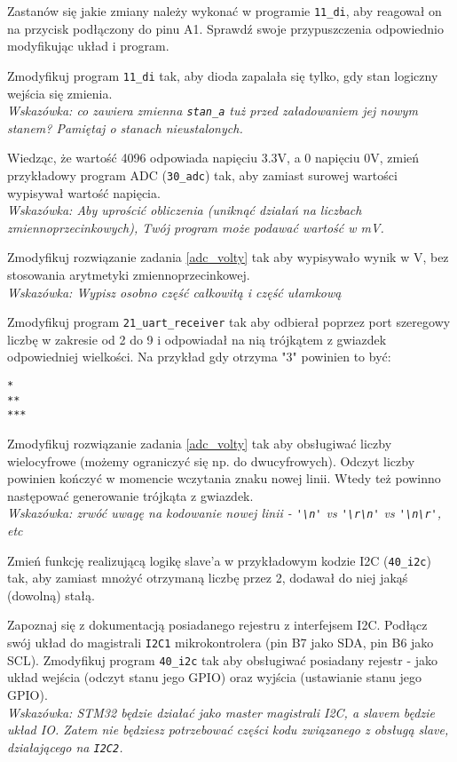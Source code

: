 \dbEntryCheckResults
  Zastanów się jakie zmiany należy wykonać w programie \Verb$11_di$, aby reagował on na przycisk podłączony do pinu A1.
  Sprawdź swoje przypuszczenia odpowiednio modyfikując układ i program.
\fi

\dbEntryCheckResults
  Zmodyfikuj program \Verb$11_di$ tak, aby dioda zapalała się tylko, gdy stan logiczny wejścia się zmienia.\\
  \textit{Wskazówka: co zawiera zmienna \texttt{\Verb$stan_a$} tuż przed załadowaniem jej nowym stanem? Pamiętaj
  o stanach nieustalonych.}
\fi

\dbEntryCheckResults
Wiedząc, że wartość 4096 odpowiada napięciu 3.3V, a 0 napięciu 0V, zmień przykładowy program ADC (\Verb$30_adc$) tak, aby zamiast surowej wartości wypisywał wartość napięcia.\\
\textit{Wskazówka: Aby uprościć obliczenia (uniknąć działań na liczbach zmiennoprzecinkowych), Twój program może podawać wartość w mV.}
\fi

\dbEntryCheckResults
Zmodyfikuj rozwiązanie zadania \ref{adc_volty} tak aby wypisywało wynik w V, bez stosowania arytmetyki zmiennoprzecinkowej.\\
\textit{Wskazówka: Wypisz osobno część całkowitą i część ułamkową}
\fi

\dbEntryCheckResults
Zmodyfikuj program \Verb$21_uart_receiver$ tak aby odbierał poprzez port szeregowy liczbę w zakresie od 2 do 9 i odpowiadał na nią trójkątem z gwiazdek odpowiedniej wielkości.
Na przykład gdy otrzyma "3" powinien to być:
\begin{Verbatim}
*
**
***
\end{Verbatim}
\fi

\dbEntryCheckResults
Zmodyfikuj rozwiązanie zadania \ref{adc_volty} tak aby obsługiwać liczby wielocyfrowe (możemy ograniczyć się np. do dwucyfrowych).
Odczyt liczby powinien kończyć w momencie wczytania znaku nowej linii. Wtedy też powinno następować generowanie trójkąta z gwiazdek.\\
\textit{Wskazówka: zrwóć uwagę na kodowanie nowej linii - \Verb$'\n'$ vs \Verb$'\r\n'$ vs \Verb$'\n\r'$, etc}
\fi

\dbEntryCheckResults
Zmień funkcję realizującą logikę slave'a w przykładowym kodzie I2C (\Verb$40_i2c$) tak, aby zamiast mnożyć otrzymaną liczbę przez 2, dodawał do niej jakąś (dowolną) stałą.
\fi

\dbEntryCheckResults
Zapoznaj się z dokumentacją posiadanego rejestru z interfejsem I2C. Podłącz swój układ do magistrali \Verb$I2C1$ mikrokontrolera (pin B7 jako SDA, pin B6 jako SCL).
Zmodyfikuj program \Verb$40_i2c$ tak aby obsługiwać posiadany rejestr - jako układ wejścia (odczyt stanu jego GPIO) oraz wyjścia (ustawianie stanu jego GPIO).\\
\textit{Wskazówka: STM32 będzie działać jako master magistrali I2C, a slavem będzie układ IO. Zatem nie będziesz potrzebować części kodu związanego z obsługą slave, działającego na \Verb$I2C2$.}
\fi
